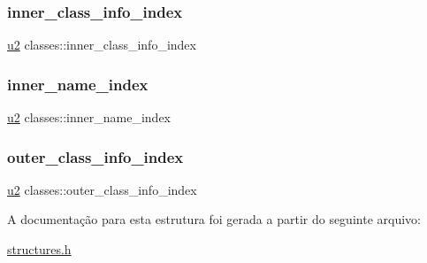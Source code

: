 \subsubsection{\texorpdfstring{inner\+\_\+class\+\_\+info\+\_\+index}{inner\_class\_info\_index}}
{\footnotesize\ttfamily \hyperlink{lista__operandos_8h_a732cde1300aafb73b0ea6c2558a7a54f}{u2} classes\+::inner\+\_\+class\+\_\+info\+\_\+index}

\mbox{\label{structclasses_a8cdb61a61adc9fc0d99acc9be0915187}} 
\subsubsection{\texorpdfstring{inner\+\_\+name\+\_\+index}{inner\_name\_index}}
{\footnotesize\ttfamily \hyperlink{lista__operandos_8h_a732cde1300aafb73b0ea6c2558a7a54f}{u2} classes\+::inner\+\_\+name\+\_\+index}

\mbox{\label{structclasses_a0f25ecea2b18dfbcf23e4a6975eb1f21}} 
\subsubsection{\texorpdfstring{outer\+\_\+class\+\_\+info\+\_\+index}{outer\_class\_info\_index}}
{\footnotesize\ttfamily \hyperlink{lista__operandos_8h_a732cde1300aafb73b0ea6c2558a7a54f}{u2} classes\+::outer\+\_\+class\+\_\+info\+\_\+index}



A documentação para esta estrutura foi gerada a partir do seguinte arquivo\+:\begin{DoxyCompactItemize}
\item 
\hyperlink{structures_8h}{structures.\+h}\end{DoxyCompactItemize}
